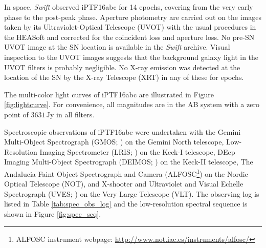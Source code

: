 \documentclass[twocolumn]{aastex61}
\begin{document}
In space, \textit{Swift} observed iPTF16abc for 14 epochs, covering
from the very early phase to the post-peak phase. Aperture photometry
are carried out on the images taken by its Ultraviolet-Optical
Telescope (UVOT) with the usual procedures in the HEASoft and
corrected for the coincident loss and aperture loss. No pre-SN UVOT
image at the SN location is available in the \textit{Swift} archive.
Visual inspection to the UVOT images suggests that the background
galaxy light in the UVOT filters is probably negligible. No X-ray
emission was detected at the location of the SN by the X-ray Telescope
(XRT) in any of these for epochs.

The multi-color light curves of iPTF16abc are illustrated in Figure
\ref{fig:lightcurve}.  For convenience, all magnitudes are in the AB
system with a zero point of $3631$\,Jy in all filters.

Spectroscopic observations of iPTF16abc were undertaken with the
Gemini Multi-Object Spectrograph (GMOS; \citealt{2004PASP..116..425H})
on the Gemini North telescope, Low-Resolution Imaging Spectrometer
(LRIS; \citealt{1995PASP..107..375O}) on the Keck-I telescope, DEep
Imaging Multi-Object Spectrograph (DEIMOS;
\citealt{2003SPIE.4841.1657F}) on the Keck-II telescope, The Andalucia
Faint Object Spectrograph and Camera (ALFOSC\footnote{ALFOSC
  instrument webpage:
  \url{http://www.not.iac.es/instruments/alfosc/}}) on the Nordic
Optical Telescope (NOT), and X-shooter \citep{2011A&A...536A.105V} and
Ultraviolet and Visual Echelle Spectrograph (UVES;
\citealt{2000SPIE.4008..534D}) on the Very Large Telescope (VLT). The
observing log is listed in Table \ref{tab:spec_obs_log} and the
low-resolution spectral sequence is shown in Figure
\ref{fig:spec_seq}.
\end{document}
